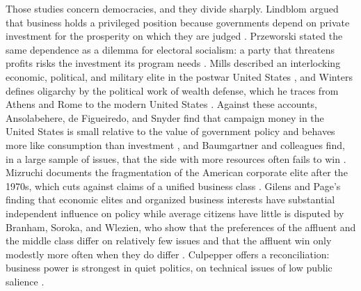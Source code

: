 \documentclass[11pt,letterpaper]{article}
\theoremstyle{definition}
\theoremstyle{remark}
\begin{document}
Those studies concern democracies, and they divide sharply. Lindblom argued that business holds a privileged position because governments depend on private investment for the prosperity on which they are judged \citep{lindblom1977}. Przeworski stated the same dependence as a dilemma for electoral socialism: a party that threatens profits risks the investment its program needs \citep{przeworski1985}. Mills described an interlocking economic, political, and military elite in the postwar United States \citep{mills1956}, and Winters defines oligarchy by the political work of wealth defense, which he traces from Athens and Rome to the modern United States \citep{winters2011}. Against these accounts, Ansolabehere, de Figueiredo, and Snyder find that campaign money in the United States is small relative to the value of government policy and behaves more like consumption than investment \citep{ansolabehere2003}, and Baumgartner and colleagues find, in a large sample of issues, that the side with more resources often fails to win \citep{baumgartner2009}. Mizruchi documents the fragmentation of the American corporate elite after the 1970s, which cuts against claims of a unified business class \citep{mizruchi2013}. Gilens and Page's finding that economic elites and organized business interests have substantial independent influence on policy while average citizens have little \citep{gilens2014} is disputed by Branham, Soroka, and Wlezien, who show that the preferences of the affluent and the middle class differ on relatively few issues and that the affluent win only modestly more often when they do differ \citep{branham2017}. Culpepper offers a reconciliation: business power is strongest in quiet politics, on technical issues of low public salience \citep{culpepper2010}.
\end{document}
